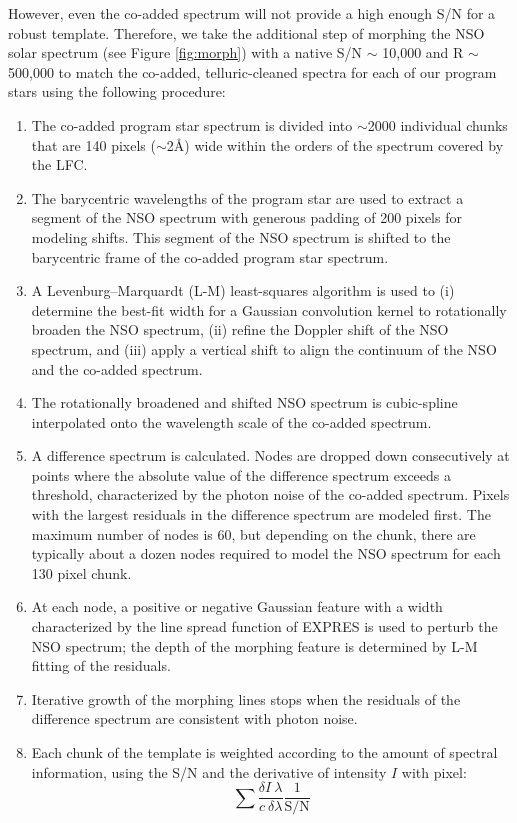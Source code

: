 However, even the co-added spectrum will not provide a high enough S/N for a robust template. Therefore, we take the additional step of morphing the NSO solar spectrum (see Figure \ref{fig:morph}) with a native S/N $\sim$ 10,000 and R $\sim$ 500,000 to match the co-added, telluric-cleaned spectra for each of our program stars using the following procedure:
\begin{enumerate} 
\item The co-added program star spectrum is divided into $\sim$2000 individual chunks that are 140 pixels ($\sim $2\AA) wide within the orders of the spectrum covered by the LFC.
\item The barycentric wavelengths of the program star are used to extract a segment of the NSO spectrum with generous padding of 200 pixels for modeling shifts. This segment of the NSO spectrum is shifted to the barycentric frame of the co-added program star spectrum.
\item A Levenburg--Marquardt (L-M) least-squares algorithm is used to (i) determine the best-fit width for a Gaussian convolution kernel to rotationally broaden the NSO spectrum, (ii) refine the Doppler shift of the NSO spectrum, and (iii) apply a vertical shift to align the continuum of the NSO and the co-added spectrum. 
\item The rotationally broadened and shifted NSO spectrum is cubic-spline interpolated onto the wavelength scale of the co-added spectrum. 
\item A difference spectrum is calculated. Nodes are dropped down consecutively at points where the absolute value of the difference spectrum exceeds a threshold, characterized by the photon noise of the co-added spectrum. Pixels with the largest residuals in the difference spectrum are modeled first. The maximum number of nodes is 60, but depending on the chunk, there are typically about a dozen nodes required to model the NSO spectrum for each 130 pixel chunk. 
\item At each node, a positive or negative Gaussian feature with a width characterized by the line spread function of EXPRES is used to perturb the NSO spectrum; the depth of the morphing feature is determined by L-M fitting of the residuals. 
\item Iterative growth of the morphing lines stops when the residuals of the difference spectrum are consistent with photon noise.
\item Each chunk of the template is weighted according to the amount of spectral information, using the S/N and the derivative of intensity $I$ with pixel:
\begin{equation}
    \sum{\frac{\delta I \ \lambda}{c \ \delta \lambda} \frac{1}{\mathrm{S/N}}}
\end{equation}
\end{enumerate}

